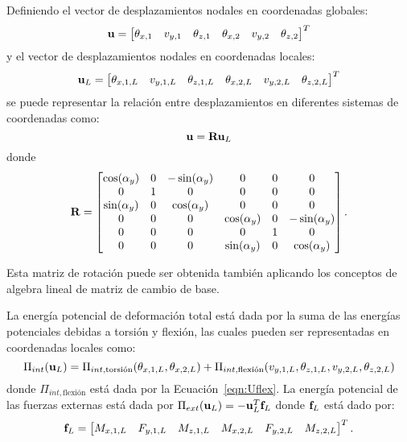 Definiendo el vector de desplazamientos nodales en coordenadas globales:
\begin{equation}
{\bf u} = 
\left[
\begin{matrix}
\theta_{x,1} & v_{y,1} & \theta_{z,1} & \theta_{x,2} & v_{y,2} & \theta_{z,2}
\end{matrix}
\right]^T
\end{equation}
%
y el vector de desplazamientos nodales en coordenadas locales:
\begin{equation}
{\bf u}_L = 
\left[
\begin{matrix}
\theta_{x,1,L} & v_{y,1,L} & \theta_{z,1,L} & \theta_{x,2,L} & v_{y,2,L} & \theta_{z,2,L}
\end{matrix}
\right]^T
\end{equation}
%
se puede representar la relación entre desplazamientos en diferentes sistemas de coordenadas como:
%
\begin{equation}\label{eqn:matrot}
{\bf u} = {\bf R} {\bf u}_L
\end{equation}
donde
\begin{equation}
\bfR = 
\left[
\begin{matrix}
\cos(\alpha_y) & 0  & -\sin(\alpha_y) & 0 & 0 & 0\\
 0 & 1 & 0 &  0 & 0 & 0\\
\sin(\alpha_y) & 0  & \cos(\alpha_y) & 0 & 0 & 0\\
%
0 & 0 & 0 & \cos(\alpha_y) & 0  & -\sin(\alpha_y) \\
0 & 0 & 0 & 0 & 1 & 0 \\
0 & 0 & 0 & \sin(\alpha_y) & 0  & \cos(\alpha_y)
\end{matrix}
\right].
%
\end{equation}


Esta matriz de rotación puede ser obtenida también aplicando los conceptos de algebra lineal de matriz de cambio de base.

La energía potencial de deformación total está dada por la suma de las energías potenciales debidas a torsión y flexión, las cuales pueden ser representadas en coordenadas locales como:
%
\begin{equation}
\Pi_{int} ({\bf u}_L ) = \Pi_{int,\text{torsión}}(\theta_{x,1,L},\theta_{x,2,L}) + \Pi_{int,\text{flexión}}(v_{y,1,L}, \theta_{z,1,L},v_{y,2,L},\theta_{z,2,L})
\end{equation}
%
donde $\Pi_{int,\text{flexión}}$ está dada por la Ecuación~\eqref{eqn:Uflex}. %
%
La energía potencial de las fuerzas externas está dada por $\Pi_{ext} ({\bf u}_L) = -{\bf u}_L^T {\bf f}_L$ donde ${\bf f}_L$ está dado por:
\begin{equation}
{\bf f}_L = 
\left[
\begin{matrix}
	M_{x,1,L} & F_{y,1,L} & M_{z,1,L} & M_{x,2,L} & F_{y,2,L} & M_{z,2,L}
\end{matrix}
\right]^T.
\end{equation}


